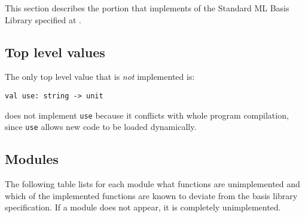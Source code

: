 
This section describes the portion that {\mlton} implements of the Standard ML
Basis Library specified at
.

\subsection{Top level values}

The only top level value that is {\em not} implemented is:
\begin{verbatim}
val use: string -> unit
\end{verbatim}
{\mlton} does not implement {\tt use} because it conflicts with whole
program compilation, since {\tt use} allows new code to be loaded
dynamically.

\subsection{Modules}
The following table lists for each module what functions are unimplemented and
which of the implemented functions are known to deviate from the basis library
specification.  If a module does not appear, it is completely unimplemented.
\\
\newcommand{\module}[3]{{\tt #1:} & {\tt #2} & #3\\}
\newcommand{\extra}[1]{&& #1\\}
\newcommand{\fullmodule}[2]{\module{#1}{#2}{Fully implemented}}

